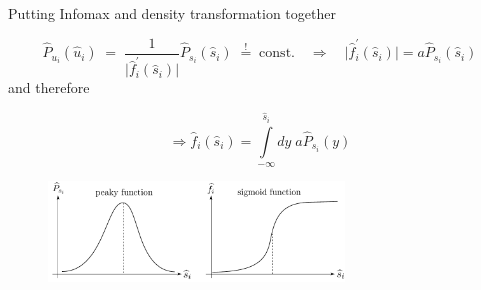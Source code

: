\begin{frame}{Putting Infomax and density transformation together}

\svspace{-5mm}


\begin{equation}
  \label{eq:dtufs}
		\widehat{P}_{u_i} (\widehat{u}_i) \; = \;   
		 \frac{1}{\big| \widehat{f}_i^{'} (\widehat{s}_i) \big|} 
		\widehat{P}_{s_i}(\widehat{s}_i) \; \stackrel{!}{=} \; \text{const.} \quad \Rightarrow \quad 
		 \big| \widehat{f}_i^{'} (\widehat{s}_i) \big| =  a \widehat{P}_{s_i}(\widehat{s}_i) 
\end{equation}
and therefore

\svspace{-3mm}

\begin{equation}
\Rightarrow \widehat{f}_i (\widehat{s}_i)
 = \int\limits_{-\infty}^{\widehat{s}_i} dy\; a 
			\widehat{P}_{s_i}(y)
\end{equation}

\begin{figure}[h]
  \centering
  \includegraphics[width=0.7\textwidth]{img/section2_fig15}  
  \label{fig:cdf}
\end{figure}

\svspace{-2mm}



\end{frame}

\newpage

